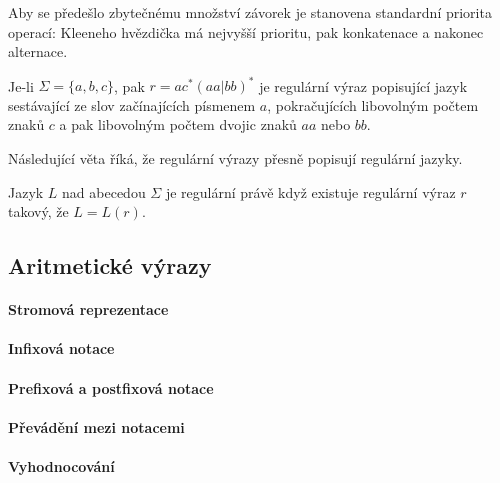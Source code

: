 Aby se předešlo zbytečnému množství závorek je stanovena standardní priorita operací: Kleeneho  hvězdička má nejvyšší prioritu, pak konkatenace a
nakonec alternace. 

\begin{example} Je-li \(\Sigma=\{a,b,c\}\), pak \(r=ac^*(aa|bb)^*\) je regulární výraz popisující jazyk sestávající ze slov začínajících písmenem \(a\), pokračujících libovolným počtem znaků \(c\)
a pak libovolným počtem dvojic znaků \(aa\) nebo \(bb\).
\end{example}

Následující věta říká, že regulární výrazy přesně popisují regulární jazyky.

\begin{theorem} Jazyk \(L\) nad abecedou \(\Sigma\) je regulární právě když existuje regulární výraz \(r\) takový, že \(L=L(r)\).
\end{theorem}


\subsection{Aritmetické výrazy}

\paragraph{Stromová reprezentace}
\paragraph{Infixová notace}
\paragraph{Prefixová a postfixová notace}
\paragraph{Převádění mezi notacemi}
\paragraph{Vyhodnocování}

\ifx\ucebnice\undefined

\fi
